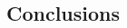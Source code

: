 \documentclass[twocolumn]{aastex631}
\begin{document}
\begin{CJK*}{UTF8}{gbsn}
\section{Conclusions} \label{sec:conclusion}






\end{CJK*}
\end{document}

